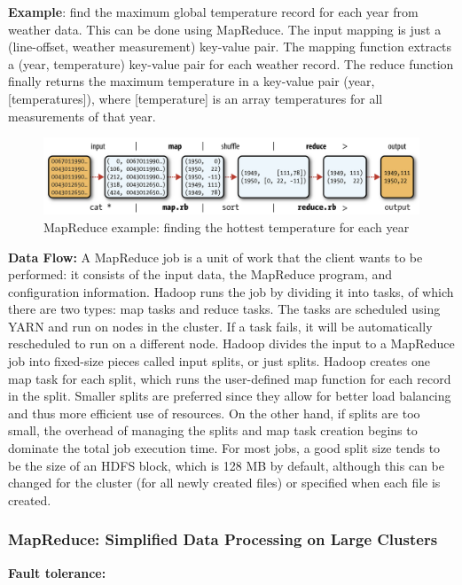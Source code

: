 \documentclass[11pt,oneside,a4paper]{article}
\begin{document}
\textbf{Example}: find the maximum global temperature record for each year from weather data. This can be done using MapReduce. The input mapping is just a (line-offset, weather measurement) key-value pair. The mapping function extracts a (year, temperature) key-value pair for each weather record. The reduce function finally returns the maximum temperature in a key-value pair (year, [temperatures]), where [temperature] is an array temperatures for all measurements of that year.

\begin{figure}[hb!]
	\centering
	\includegraphics[width=0.7\linewidth]{figures/mr_reading_weather_example}
	\caption{MapReduce example: finding the hottest temperature for each year}
	\label{fig:mrreadingweatherexample}
\end{figure}

\textbf{Data Flow:} A MapReduce job is a unit of work that the client wants to be performed: it consists of the input data, the MapReduce program, and configuration information. Hadoop runs the job by dividing it into tasks, of which there are two types: map tasks and reduce tasks. The tasks are scheduled using YARN and run on nodes in the cluster. If a task fails, it will be automatically rescheduled to run on a different node. Hadoop divides the input to a MapReduce job into fixed-size pieces called input splits, or just splits. Hadoop creates one map task for each split, which runs the user-defined map function for each record in the split. Smaller splits are preferred since they allow for better load balancing and thus more efficient use of resources. On the other hand, if splits are too small, the overhead of managing the splits and map task creation begins to dominate the total job execution time. For most jobs, a good split size tends to be the size of an HDFS block, which is 128 MB by default, although this can be changed for the cluster (for all newly created files) or specified when each file is created.

\subsubsection{MapReduce: Simplified Data Processing on Large Clusters}

\textbf{Fault tolerance:}
\end{document}
